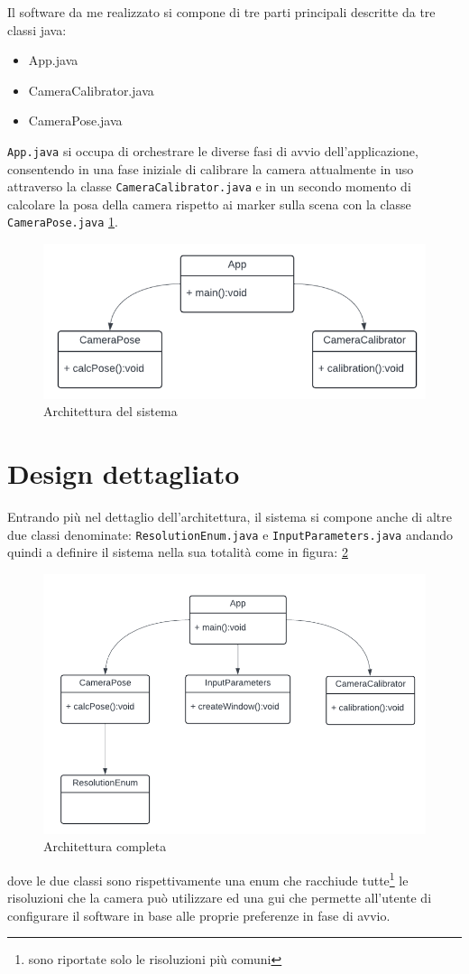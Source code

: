 \documentclass[12pt,a4paper,openright,twoside]{book}
\begin{document}
Il software da me realizzato si compone di tre parti principali descritte da tre classi java:
\begin{itemize}
	\item App.java
	\item CameraCalibrator.java
	\item CameraPose.java
\end{itemize}
\texttt{App.java} si occupa di orchestrare le diverse fasi di avvio dell'applicazione, consentendo in una fase iniziale di calibrare la camera attualmente in uso attraverso la classe \texttt{CameraCalibrator.java} e in un secondo momento di calcolare la posa della camera rispetto ai marker sulla scena con la classe \texttt{CameraPose.java} \ref{fig:architettura}.
\begin{figure}[h!]
	\centering
	\includegraphics[width=0.8\linewidth]{./figures/UML/architecture.png}
	\caption{Architettura del sistema}
	\label{fig:architettura}
\end{figure}

\section{Design dettagliato}
Entrando più nel dettaglio dell'architettura, il sistema si compone anche di altre due classi denominate: \texttt{ResolutionEnum.java} e \texttt{InputParameters.java} andando quindi a definire il sistema nella sua totalità come in figura: \ref{fig:architettura_completa}
\begin{figure}
	\centering
	\includegraphics[width=0.8\linewidth]{./figures/UML/fullArchitecture.png}
	\caption{Architettura completa}
	\label{fig:architettura_completa}
\end{figure}
dove le due classi sono rispettivamente una enum che racchiude tutte\footnote{sono riportate solo le risoluzioni più comuni} le risoluzioni che la camera può utilizzare ed una \acrfull{gui} che permette all'utente di configurare il software in base alle proprie preferenze in fase di avvio.
\end{document}
